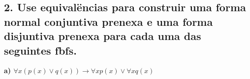 \subsection*{2. Use equivalëncias para construir uma forma normal conjuntiva prenexa e uma forma disjuntiva prenexa para cada uma das seguintes fbfs.}

\textbf{a) $\forall x (p(x) \lor q(x)) \rightarrow \forall x p(x) \lor \forall x q(x) $} \\